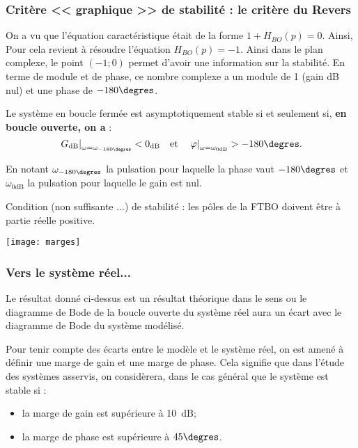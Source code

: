 \subsubsection{Critère << graphique >> de stabilité : le critère du Revers}

 
 On a vu que l'équation caractéristique était de la forme $1+H_{BO}(p)=0$. Ainsi, Pour cela revient à résoudre l'équation $H_{BO}(p)=-1$. Ainsi dans le plan complexe, le point $(-1;0)$ permet d'avoir une information sur la stabilité. En terme de module et de phase, ce nombre complexe a un module de 1 (gain dB nul) et une phase de $-180\degres$.
 
\begin{resultat}[Critère du Revers]
Le système en boucle fermée est asymptotiquement stable si et seulement si, \textbf{en boucle ouverte, on a} :
$$
\left. G_{\text{dB}} \right|_{\omega=\omega_{-180\degres}}<0_{\text{dB}} 
\quad
\text{et}
\quad
\left. \varphi \right|_{\omega=\omega_{0\text{dB}}}>-180\degres.
$$

En notant $\omega_{-180\degres}$ la pulsation pour laquelle la phase vaut $-180\degres$ et $\omega_{0\text{dB}}$ la pulsation pour laquelle le gain est nul.
\end{resultat}
 
 
\begin{resultat}
Condition (non suffisante ...) de stabilité : les pôles de la FTBO doivent être à partie réelle positive.
\end{resultat}
 
\begin{center}
\texttt{[image: marges]}
\end{center} 
\subsubsection{Vers le système réel...}

Le résultat donné ci-dessus est un résultat théorique dans le sens ou le diagramme de Bode de la boucle ouverte du système réel aura un écart avec le diagramme de Bode du système modélisé. 


\begin{resultat}[Marges]
Pour tenir compte des écarts entre le modèle et le système réel, on est amené à définir une marge de gain et une marge de phase. Cela signifie que dans l'étude des systèmes asservis, on considèrera, dans le cas général que le système est stable si :
\begin{itemize}
\item la marge de gain est supérieure à \SI{10}{dB};
\item la marge de phase est supérieure à $45\degres$.
\end{itemize}
\end{resultat}

